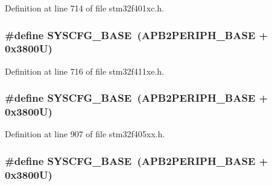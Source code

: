 Definition at line 714 of file stm32f401xc.\+h.

\subsubsection[{\texorpdfstring{S\+Y\+S\+C\+F\+G\+\_\+\+B\+A\+SE}{SYSCFG_BASE}}]{\setlength{\rightskip}{0pt plus 5cm}\#define S\+Y\+S\+C\+F\+G\+\_\+\+B\+A\+SE~({\bf A\+P\+B2\+P\+E\+R\+I\+P\+H\+\_\+\+B\+A\+SE} + 0x3800\+U)}\hypertarget{group___peripheral__registers__structures_ga62246020bf3b34b6a4d8d0e84ec79d3d}{}\label{group___peripheral__registers__structures_ga62246020bf3b34b6a4d8d0e84ec79d3d}


Definition at line 716 of file stm32f411xe.\+h.

\subsubsection[{\texorpdfstring{S\+Y\+S\+C\+F\+G\+\_\+\+B\+A\+SE}{SYSCFG_BASE}}]{\setlength{\rightskip}{0pt plus 5cm}\#define S\+Y\+S\+C\+F\+G\+\_\+\+B\+A\+SE~({\bf A\+P\+B2\+P\+E\+R\+I\+P\+H\+\_\+\+B\+A\+SE} + 0x3800\+U)}\hypertarget{group___peripheral__registers__structures_ga62246020bf3b34b6a4d8d0e84ec79d3d}{}\label{group___peripheral__registers__structures_ga62246020bf3b34b6a4d8d0e84ec79d3d}


Definition at line 907 of file stm32f405xx.\+h.

\subsubsection[{\texorpdfstring{S\+Y\+S\+C\+F\+G\+\_\+\+B\+A\+SE}{SYSCFG_BASE}}]{\setlength{\rightskip}{0pt plus 5cm}\#define S\+Y\+S\+C\+F\+G\+\_\+\+B\+A\+SE~({\bf A\+P\+B2\+P\+E\+R\+I\+P\+H\+\_\+\+B\+A\+SE} + 0x3800\+U)}\hypertarget{group___peripheral__registers__structures_ga62246020bf3b34b6a4d8d0e84ec79d3d}{}\label{group___peripheral__registers__structures_ga62246020bf3b34b6a4d8d0e84ec79d3d}



